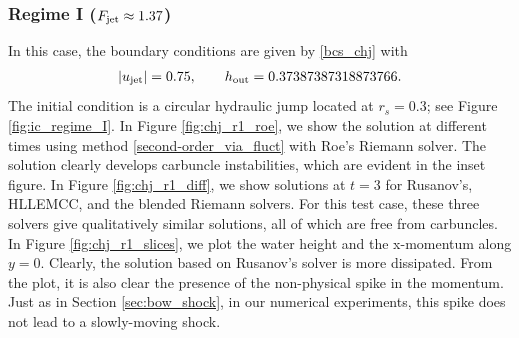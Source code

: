 \documentclass[preprint, 11pt]{article}
\newcommand{\out}{\textup{out}}
\newcommand{\jet}{{\textup{jet}}}
\newcommand{\bfu}{{u}}
\begin{document}
\subsubsection{Regime I ($F_\jet\approx1.37$)}\label{sec:regime_i}
In this case, the boundary conditions are given by \eqref{bcs_chj} with
\begin{align}\label{bcs_chj_r1}
  |\bfu_\jet|=0.75, \qquad h_\out=0.37387387318873766. 
\end{align}
The initial condition is a circular hydraulic jump located at $r_s=0.3$; see Figure \ref{fig:ic_regime_I}. 
In Figure \ref{fig:chj_r1_roe}, we show the solution at different times using
method \eqref{second-order_via_fluct} with Roe's Riemann solver.
The solution clearly develops carbuncle instabilities, which are evident in the inset figure.
In Figure \ref{fig:chj_r1_diff}, we show solutions at $t=3$ for
Rusanov's, HLLEMCC, and the blended Riemann solvers.
For this test case, these three solvers give qualitatively similar solutions,
all of which are free from carbuncles.
{\color{OliveGreen} In Figure \ref{fig:chj_r1_slices}, we plot the water height and the x-momentum along $y=0$.
  Clearly, the solution based on Rusanov's solver is more dissipated. From the plot, it is also clear the presence
  of the non-physical spike in the momentum. Just as in Section \ref{sec:bow_shock}, in our numerical experiments,
  this spike does not lead to a slowly-moving shock.}
\end{document}
